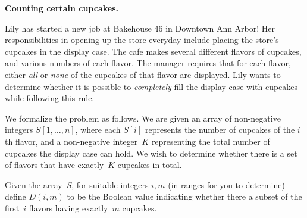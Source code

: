 \documentclass[11pt,addpoints]{exam}
\begin{document}
\begin{questions}
\begin{parts}
\begin{solution}
    \end{solution}
  \end{parts}

  \question%
  \textbf{Counting certain cupcakes.}
  
  Lily has started a new job at Bakehouse 46 in Downtown Ann Arbor!
  Her responsibilities in opening up the store everyday include placing the store's cupcakes in the display case.
  The cafe makes several different flavors of cupcakes, and various numbers of each flavor.
  The manager requires that for each flavor, either \emph{all} or \emph{none} of the cupcakes of that flavor are displayed.
  Lily wants to determine whether it is possible to \emph{completely} fill the display case with cupcakes while following this rule.
    
  We formalize the problem as follows.
  We are given an array of non-negative integers $S[1,\ldots,n]$, where each $S[i]$ represents the number of cupcakes of the $i$th flavor, and a non-negative integer~$K$ representing the total number of cupcakes the display case can hold.
  We wish to determine whether there is a set of flavors that have exactly~$K$ cupcakes in total.

  Given the array~$S$, for suitable integers $i,m$ (in ranges for you to determine) define $D(i,m)$ to be the Boolean value indicating whether there a subset of the first~$i$ flavors having exactly~$m$ cupcakes.

\end{questions}
\end{document}
